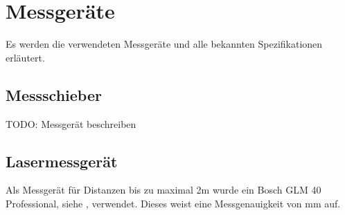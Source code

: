 \section{Messgeräte}\label{anhang:messung:messgeraete}
Es werden die verwendeten Messgeräte und alle bekannten Spezifikationen erläutert.

\subsection{Messschieber}
TODO: Messgerät beschreiben

\subsection{Lasermessgerät}

Als Messgerät für Distanzen bis zu maximal 2\si{\metre} wurde ein Bosch GLM 40 Professional, siehe \cite{bosch:glm40}, verwendet.
Dieses weist eine Messgenauigkeit von \si{\milli\metre} auf.
